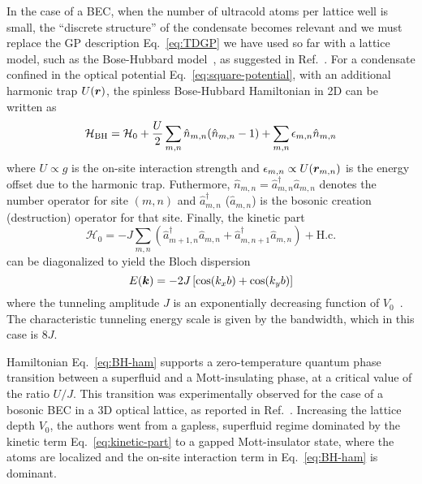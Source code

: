 In the case of a BEC, when the number of ultracold atoms per lattice
well is small, the ``discrete structure'' of the condensate becomes
relevant and we must replace the GP description Eq.~\eqref{eq:TDGP} we
have used so far with a lattice model, such as the Bose-Hubbard
model~\cite{PhysRevB.40.546}, as suggested in
Ref.~\cite{Jaksch3108}. For a condensate confined in the optical
potential Eq.~\eqref{eq:square-potential}, with an additional harmonic
trap $U(\bm{r})$, the spinless Bose-Hubbard Hamiltonian in 2D can be
written as~\cite{zwerger2003}
%
\begin{equation}\label{eq:BH-ham}
  \mathcal{H}_{\text{BH}} = \mathcal{H}_0 + \frac{U}{2}\sum_{m,n} \hat{n}_{m,n}(\hat{n}_{m,n} - 1) + \sum_{m,n} \epsilon_{m,n} \hat{n}_{m,n}
\end{equation}
% 
where $U \propto g$ is the on-site interaction strength and
$\epsilon_{m,n} \propto U(\bm{r}_{m,n})$ is the energy offset due to the
harmonic trap. Futhermore,
$\hat{n}_{m,n} = \hat{a}_{m,n}^{\dagger} \hat{a}_{m,n}$ denotes the
number operator for site $(m,n)$ and $\hat{a}_{m,n}^{\dagger}$
($\hat{a}_{m,n}$) is the bosonic creation (destruction) operator for
that site. Finally, the kinetic part
%
\begin{equation}\label{eq:kinetic-part}
  \mathcal{H}_0 = -J \sum_{m,n} \left(\hat{a}^{\dagger}_{m+1,n}\hat{a}_{m,n} + \hat{a}^{\dagger}_{m,n+1}\hat{a}_{m,n}\right) + \text{H.c.}
\end{equation}
% 
can be diagonalized to yield the Bloch dispersion
%
\begin{equation}\label{eq:tb-dispersion}
  E(\bm{k}) = -2J\left[\cos(k_x b) + \cos(k_y b)\right]
\end{equation}
% 
where the tunneling amplitude $J$ is an exponentially decreasing
function of $V_0$~\cite{zwerger2003}. The characteristic tunneling
energy scale is given by the bandwidth, which in this case is $8J$.

Hamiltonian Eq.~\eqref{eq:BH-ham} supports a zero-temperature quantum
phase transition between a superfluid and a Mott-insulating phase, at
a critical value of the ratio $U/J$. This transition was
experimentally observed for the case of a bosonic BEC in a 3D optical
lattice, as reported in Ref.~\cite{greiner2002quantum}. Increasing the
lattice depth $V_0$, the authors went from a gapless, superfluid
regime dominated by the kinetic term Eq.~\eqref{eq:kinetic-part} to a
gapped Mott-insulator state, where the atoms are localized and the
on-site interaction term in Eq.~\eqref{eq:BH-ham} is dominant.

